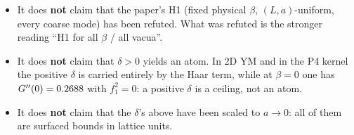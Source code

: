\begin{itemize}
\item It does \textbf{not} claim that the paper's H1 (fixed physical $\beta$, $(L,a)$-uniform, every
      coarse mode) has been refuted. What was refuted is the stronger reading ``H1 for all $\beta$ /
      all vacua''. \LT
\item It does \textbf{not} claim that $\delta>0$ yields an atom. In 2D YM and in the P4 kernel the
      positive $\delta$ is carried entirely by the Haar term, while at $\beta=0$ one has
      $G''(0)=0.2688$ with $f_1^{2}=0$: a positive $\delta$ is a ceiling, not an atom. \LT
\item It does \textbf{not} claim that the $\delta$'s above have been scaled to $a\to0$: all of them
      are surfaced bounds in lattice units. \LM
\end{itemize}
